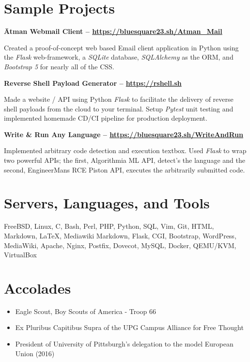 \documentclass{article}
\begin{document}
\section{Sample Projects}

\noindent
\textbf{Ātman Webmail Client -- \url{https://bluesquare23.sh/Atman_Mail}}

Created a proof-of-concept web based Email client application in Python using
the \emph{Flask} web-framework, a \emph{SQLite} database, \emph{SQLAlchemy} as
the ORM, and \emph{Bootstrap 5} for nearly all of the CSS.

\noindent
\textbf{Reverse Shell Payload Generator -- \url{https://rshell.sh}}

Made a website / API using Python \emph{Flask} to facilitate the delivery of
reverse shell payloads from the cloud to your terminal. Setup \emph{Pytest}
unit testing and implemented homemade CD/CI pipeline for production deployment.

\noindent
\textbf{Write \& Run Any Language -- \url{https://bluesquare23.sh/WriteAndRun}}

Implemented arbitrary code detection and execution textbox. Used \emph{Flask}
to wrap two powerful APIs; the first, Algorithmia ML API, detect's the language
and the second, EngineerMans RCE Piston API, executes the arbitrarily submitted
code.

\section{Servers, Languages, and Tools}

FreeBSD, Linux, C, Bash, Perl, PHP, Python, SQL, Vim, Git, HTML, Markdown,
{\LaTeX}, Mediawiki Markdown, Flask, CGI, Bootstrap, WordPress, MediaWiki,
Apache, Nginx, Postfix, Dovecot, MySQL, Docker, QEMU/KVM, VirtualBox 

\section{Accolades}

\begin{itemize}
\itemsep0em

\item Eagle Scout, Boy Scouts of America - Troop 66

\item Ex Pluribus Capitibus Supra of the UPG Campus Alliance for Free Thought

\item President of University of Pittsburgh's delegation to the model European Union (2016)
\end{itemize}
\end{document}

